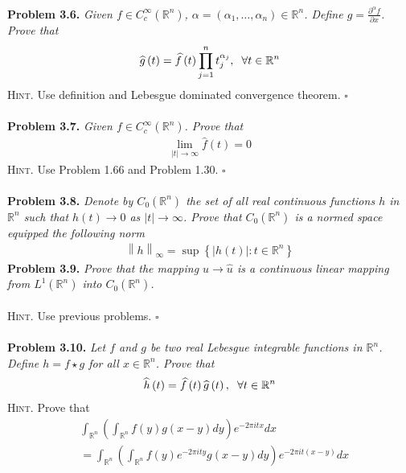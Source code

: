\documentclass[a4paper]{article}
\numberwithin{equation}{section}
\begin{document}
\\
\textbf{Problem 3.6.} \textit{Given $f\in C_c^\infty \left(\mathbb{R}^n\right)$, $\alpha =\left(\alpha _1,\ldots,\alpha _n\right) \in \mathbb{R}^n$. Define $g = \frac{{{\partial ^\alpha }f}}{{\partial x}}$. Prove that}
\begin{align}
\widehat g\left( t \right) = \widehat f\left( t \right)\prod\limits_{j = 1}^n {t_j^{{\alpha _j}}} ,\hspace{0.2cm}\forall t \in {\mathbb{R}^n}
\end{align}
\textsc{Hint.} Use definition and Lebesgue dominated convergence theorem. \hfill $\square$\\
\\
\textbf{Problem 3.7.} \textit{Given $f\in C_c^\infty \left(\mathbb{R}^n\right)$. Prove that}
\begin{align}
\mathop {\lim }\limits_{\left| t \right| \to \infty } \widehat f\left( t \right) = 0
\end{align}
\textsc{Hint.} Use Problem 1.66 and Problem 1.30. \hfill $\square$\\
\\
\textbf{Problem 3.8.} \textit{Denote by $C_0\left(\mathbb{R}^n\right)$ the set of all real continuous functions $h$ in $\mathbb{R}^n$ such that $h\left(t\right) \to 0$ as $\left| t \right| \to \infty $. Prove that $C_0\left(\mathbb{R}^n\right)$ is a normed space equipped the following norm}
\begin{align}
{\left\| h \right\|_\infty } = \sup \left\{ {\left| {h\left( t \right)} \right|:t \in {\mathbb{R}^n}} \right\}
\end{align}
\textbf{Problem 3.9.} \textit{Prove that the mapping $u\to \widehat u$ is a continuous linear mapping from $L^1\left(\mathbb{R}^n\right)$ into $C_0\left(\mathbb{R}^n\right)$.}\\
\\
\textsc{Hint.} Use previous problems. \hfill $\square$\\
\\
\textbf{Problem 3.10.} \textit{Let $f$ and $g$ be two real Lebesgue integrable functions in $\mathbb{R}^n$. Define $h=f\star g$ for all $x\in \mathbb{R}^n$. Prove that}
\begin{align}
\widehat h\left( t \right) = \widehat f\left( t \right)\widehat g\left( t \right),\hspace{0.2cm}\forall t \in {\mathbb{R}^n}
\end{align}
\textsc{Hint.} Prove that
\begin{align}
&\int_{{\mathbb{R}^n}} {\left( {\int_{{\mathbb{R}^n}} {f\left( y \right)g\left( {x - y} \right)dy} } \right){e^{ - 2\pi itx}}dx} \\
& = \int_{{\mathbb{R}^n}} {\left( {\int_{{\mathbb{R}^n}} {f\left( y \right){e^{ - 2\pi ity}}g\left( {x - y} \right)dy} } \right){e^{ - 2\pi it\left( {x - y} \right)}}dx} 
\end{align}
\end{document}

